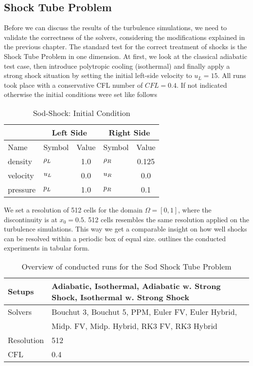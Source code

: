 \subsection{ Shock Tube Problem}
\label{sec:sod-shock-tube}
Before we can discuss the results of the turbulence simulations, we
need to validate the correctness of the solvers, considering the
modifications explained in the previous chapter. The standard test for the
correct treatment of shocks is the  Shock Tube Problem in one
dimension. At first, we look at the classical adiabatic test case, then
introduce polytropic cooling (isothermal) and finally apply a strong shock
situation by setting the initial left-side velocity to $u_L = 15$. All runs took
place with a conservative CFL number of $CFL = 0.4$.
If not indicated otherwise the initial conditions were set like follows
\begin{table}[H]
\caption{Sod-Shock: Initial Condition}
\centering
\begin{tabular}{llc|lc}
\toprule
&
\multicolumn{2}{c}{Left Side} &
\multicolumn{2}{c}{Right Side} \\
\midrule
Name & Symbol & Value & Symbol & Value\\
\midrule
density         & $\rho_{L}$       & 1.0 & $\rho_{R}$ & 0.125 \\ 
velocity        & $u_{L}$       & 0.0 & $u_{R}$ & 0.0 \\ 
pressure        & $p_{L}$       & 1.0 & $p_{R}$ & 0.1 \\  
\bottomrule
\end{tabular}
\label{tab:initial-state-sod-shock}
\end{table}
We set a resolution of 512 cells for the domain $\Omega = [0,1]$, where the
discontinuity is at $x_0 = 0.5$.  512 cells resembles the same resolution
applied on the turbulence simulations. This way we get a comparable insight on
how well shocks can be resolved within a periodic box of equal size.
 outlines the conducted experiments in tabular form.
\begin{table}[H]
\caption{Overview of conducted runs for the Sod Shock Tube Problem}
\centering
\begin{tabular}{l|l}
\toprule
Setups & Adiabatic, Isothermal, Adiabatic w. Strong Shock,
Isothermal w. Strong Shock \\ 
\midrule
Solvers  & Bouchut 3, Bouchut 5, PPM, Euler FV, Euler Hybrid\footnotemark[1],\\
& Midp. FV, Midp. Hybrid, RK3 FV, RK3 Hybrid \\ 
\midrule
Resolution & 512 \\
\midrule
CFL    &  0.4 \\
\bottomrule
\end{tabular}
\label{tab:sod-runs}
\end{table}

